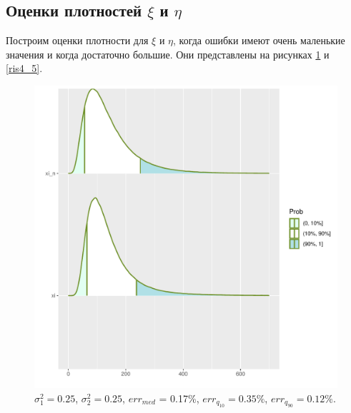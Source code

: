 \documentclass[specialist, substylefile = spbu.rtx,
subf,href,colorlinks=true, 12pt]{disser}
\begin{document}
\subsection{Оценки плотностей $\xi$ и $\eta$}

Построим оценки плотности для $\xi$ и $\eta$, когда ошибки имеют очень маленькие значения и когда достаточно большие. Они представлены на рисунках \ref{ris4_4} и \ref{ris4_5}.

\begin{figure}[!hhh]
	\begin{center}
		\begin{minipage}[h]{0.95\linewidth}
			\includegraphics[width=1\linewidth]{img/sr1.pdf}
			\caption{$\sigma_{1}^{2} = 0.25$, $\sigma_{2}^{2} = 0.25$, $err_{med}$ = 0.17\%,  $err_{q_{10}} = 0.35\%$,  $err_{q_{90}} = 0.12\%$. } %
			\label{ris4_4} %
		\end{minipage}
		
	\end{center}
\end{figure}
\end{document}
